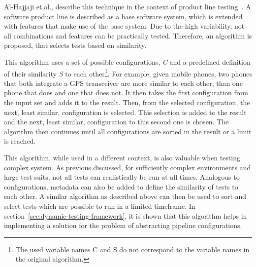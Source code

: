 Al-Hajjaji et.al., describe this technique in the context of product line testing~\cite{SimilarityBasedPrioritizationInSoftwareProductLineTesting}.
A software product line is described as a base software system, which is extended with features that make use of the base system.
Due to the high variability, not all combinations and features can be practically tested.
Therefore, an algorithm is proposed, that selects tests based on similarity.

This algorithm uses a set of possible configurations, \textit{C} and a predefined definition of their similarity \textit{S} to each other\footnote{The used variable names C and S do not correspond to the variable names in the original algorithm.}.
For example, given mobile phones, two phones that both integrate a GPS transceiver are more similar to each other, than one phone that does and one that does not.
It then takes the first configuration from the input set and adds it to the result.
Then, from the selected configuration, the next, least similar, configuration is selected.
This selection is added to the result and the next, least similar, configuration to this second one is chosen.
The algorithm then continues until all configurations are sorted in the result or a limit is reached.

This algorithm, while used in a different context, is also valuable when testing complex system.
As previous discussed, for sufficiently complex environments and large test suits, not all tests can realistically be run at all times.
Analogous to configurations, metadata can also be added to define the similarity of tests to each other.
A similar algorithm as described above can then be used to sort and select tests which are possible to run in a limited timeframe.
In section~\ref{sec:dynamic-testing-framework}, it is shown that this algorithm helps in implementing a solution for the problem of abstracting pipeline configurations.
